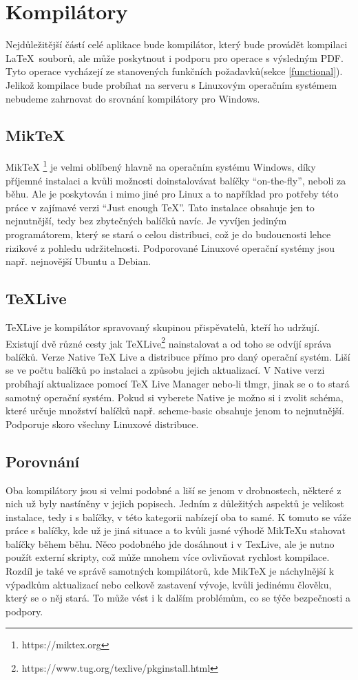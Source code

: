 \section{Kompilátory}
Nejdůležitější částí celé aplikace bude kompilátor, který bude provádět kompilaci \LaTeX\ souborů, ale může poskytnout i podporu pro operace s výsledným PDF. Tyto operace vycházejí ze stanovených funkčních požadavků(sekce \ref{functional}). Jelikož kompilace bude probíhat na serveru s Linuxovým operačním systémem nebudeme zahrnovat do srovnání kompilátory pro Windows.

\subsection{MikTeX}
MikTeX \footnote{https://miktex.org} je velmi oblíbený hlavně na operačním systému Windows, díky příjemné instalaci a kvůli možnosti doinstalovávat balíčky \enquote{on-the-fly}, neboli za běhu. Ale je poskytován i mimo jiné pro Linux a to například pro potřeby této práce v zajímavé verzi \enquote{Just enough TeX}. Tato instalace obsahuje jen to nejnutnější, tedy bez zbytečných balíčků navíc. Je vyvíjen jediným programátorem, který se stará o celou distribuci, což je do budoucnosti lehce rizikové z pohledu udržitelnosti. Podporované Linuxové operační systémy jsou např. nejnovější Ubuntu a Debian.

\subsection{TeXLive}
TeXLive je kompilátor spravovaný skupinou přispěvatelů, kteří ho udržují. Existují dvě různé cesty jak TeXLive\footnote{https://www.tug.org/texlive/pkginstall.html} nainstalovat a od toho se odvíjí správa balíčků. Verze Native TeX Live a distribuce přímo pro daný operační systém. Liší se ve počtu balíčků po instalaci a způsobu jejich aktualizací. V Native verzi probíhají aktualizace pomocí TeX Live Manager nebo-li tlmgr, jinak se o to stará samotný operační systém. Pokud si vyberete Native je možno si i zvolit schéma, které určuje množství balíčků např. scheme-basic obsahuje jenom to nejnutnější. Podporuje skoro všechny Linuxové distribuce.

\subsection{Porovnání} \label{compilator}
Oba kompilátory jsou si velmi podobné a liší se jenom v drobnostech, některé z nich už byly nastíněny v jejich popisech. Jedním z důležitých aspektů je velikost instalace, tedy i s balíčky, v této kategorii nabízejí oba to samé. K tomuto se váže práce s balíčky, kde už je jiná situace a to kvůli jasné výhodě MikTeXu stahovat balíčky během běhu. Něco podobného jde dosáhnout i v TexLive, ale je nutno použít externí skripty, což může mnohem více ovlivňovat rychlost kompilace. 
Rozdíl je také ve správě samotných kompilátorů, kde MikTeX je náchylnější k výpadkům aktualizací nebo celkově zastavení vývoje, kvůli jedinému člověku, který se o něj stará. To může vést i k dalším problémům, co se týče bezpečnosti a podpory.
